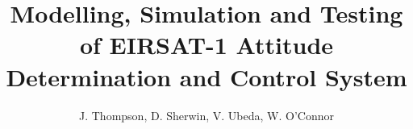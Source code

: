 \documentclass[11pt]{article}
\title{Modelling, Simulation and Testing of EIRSAT-1 Attitude Determination and Control System}
\author{J. Thompson, D. Sherwin, V. Ubeda, W. O'Connor}
\begin{document}
\maketitle
\tableofcontents




%
%

{}

\end{document}
